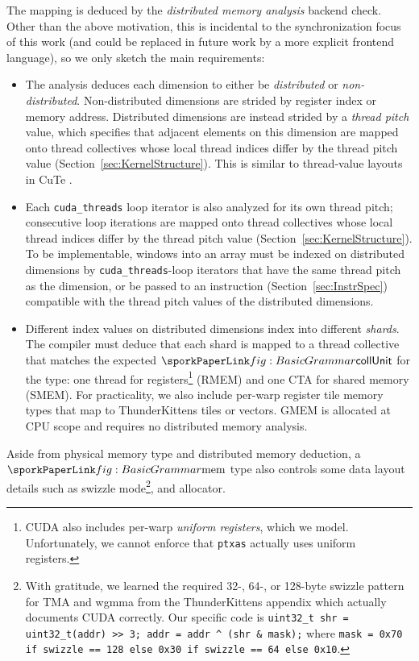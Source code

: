 The mapping is deduced by the \emph{distributed memory analysis} backend check.
Other than the above motivation, this is incidental to the synchronization focus of this work
(and could be replaced in future work by a more explicit frontend language),
so we only sketch the main requirements:
\begin{itemize}
  \item
    The analysis deduces each dimension to either be \emph{distributed} or \emph{non-distributed}.
    Non-distributed dimensions are strided by register index or memory address.
    Distributed dimensions are instead strided by a \emph{thread pitch} value,
    which specifies that adjacent elements on this dimension are mapped onto thread collectives
    whose local thread indices differ by the thread pitch value (Section~\ref{sec:KernelStructure}).
    This is similar to thread-value layouts in CuTe \cite{cute}.
  \item
    Each \texttt{cuda\_threads} loop iterator is also analyzed for its own thread pitch;
    consecutive loop iterations are mapped onto thread collectives
    whose local thread indices differ by the thread pitch value (Section~\ref{sec:KernelStructure}).
    To be implementable, windows into an array must be indexed on distributed dimensions
    by \texttt{cuda\_threads}-loop iterators that have the same thread pitch as the dimension,
    or be passed to an instruction (Section~\ref{sec:InstrSpec})
    compatible with the thread pitch values of the distributed dimensions.
  \item
    Different index values on distributed dimensions index into different \emph{shards}.
    The compiler must deduce that each shard is mapped to a thread collective that matches the
    expected $\sporkcollUnit$ for the type:
    one thread for registers\footnote{CUDA also includes per-warp \emph{uniform registers},
    which we model.
    Unfortunately, we cannot enforce that \texttt{ptxas} actually uses uniform registers.}
    (RMEM) and one CTA for shared memory (SMEM).
    For practicality, we also include per-warp register tile memory types that map to
    ThunderKittens tiles or vectors\cite{thunderkittens}.
    GMEM is allocated at CPU scope and requires no distributed memory analysis.
\end{itemize}

Aside from physical memory type and distributed memory deduction,
a $\sporkmem$ type also controls some data layout details such as swizzle
mode\footnote{With gratitude, we learned the required 32-, 64-, or 128-byte swizzle pattern for TMA and wgmma from the ThunderKittens appendix \cite{thunderkittens} which actually documents CUDA correctly.
Our specific code is \texttt{uint32\_t shr = uint32\_t(addr) >> 3; addr = addr \textasciicircum~(shr \& mask);} where \texttt{mask = 0x70 if swizzle == 128 else 0x30 if swizzle == 64 else 0x10}.
},
and allocator.


